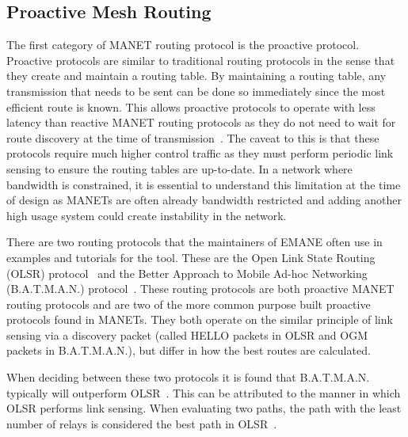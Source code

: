 \subsection{Proactive Mesh Routing}
The first category of MANET routing protocol is the proactive protocol.
Proactive protocols are similar to traditional routing protocols in the sense that they create and maintain a routing table.
By maintaining a routing table, any transmission that needs to be sent can be done so immediately since the most efficient route is known.
This allows proactive protocols to operate with less latency than reactive MANET routing protocols as they do not need to wait for route discovery at the time of transmission~\cite{manet_performance}.
The caveat to this is that these protocols require much higher control traffic as they must perform periodic link sensing to ensure the routing tables are up-to-date.
In a network where bandwidth is constrained, it is essential to understand this limitation at the time of design as MANETs are often already bandwidth restricted and adding another high usage system could create instability in the network.\par
There are two routing protocols that the maintainers of EMANE often use in examples and tutorials for the tool.
These are the Open Link State Routing (OLSR) protocol~\cite{rfc_olsr} and the Better Approach to Mobile Ad-hoc Networking (B.A.T.M.A.N.) protocol~\cite{batman}. 
These routing protocols are both proactive MANET routing protocols and are two of the more common purpose built proactive protocols found in MANETs.
They both operate on the similar principle of link sensing via a discovery packet (called HELLO packets in OLSR and OGM packets in B.A.T.M.A.N.), but differ in how the best routes are calculated.\par
When deciding between these two protocols it is found that B.A.T.M.A.N. typically will outperform OLSR~\cite{olsrd_batman}.
This can be attributed to the manner in which OLSR performs link sensing.
When evaluating two paths, the path with the least number of relays is considered the best path in OLSR~\cite{rfc_olsr}.
